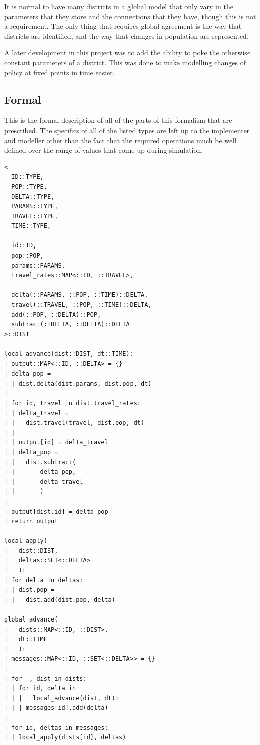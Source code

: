 \documentclass[twocolumn]{article}
\begin{document}
It is normal to have many districts in a global model that only vary in the parameters that they store and the connections that they have, though this is not a requirement. The only thing that requires global agreement is the way that districts are identified, and the way that changes in population are represented.

A later development in this project was to add the ability to poke the otherwise constant parameters of a district. This was done to make modelling changes of policy at fixed points in time easier.

\subsection{Formal}

This is the formal description of all of the parts of this formalism that are prescribed. The specifics of all of the listed types are left up to the implementer and modeller other than the fact that the required operations much be well defined over the range of values that come up during simulation.

\begin{verbatim}
<
  ID::TYPE, 
  POP::TYPE, 
  DELTA::TYPE, 
  PARAMS::TYPE, 
  TRAVEL::TYPE, 
  TIME::TYPE,
  
  id::ID, 
  pop::POP, 
  params::PARAMS, 
  travel_rates::MAP<::ID, ::TRAVEL>, 
  
  delta(::PARAMS, ::POP, ::TIME)::DELTA, 
  travel(::TRAVEL, ::POP, ::TIME)::DELTA, 
  add(::POP, ::DELTA)::POP, 
  subtract(::DELTA, ::DELTA)::DELTA
>::DIST

local_advance(dist::DIST, dt::TIME):
| output::MAP<::ID, ::DELTA> = {}
| delta_pop = 
| | dist.delta(dist.params, dist.pop, dt)
| 
| for id, travel in dist.travel_rates:
| | delta_travel = 
| |   dist.travel(travel, dist.pop, dt)
| | 
| | output[id] = delta_travel
| | delta_pop = 
| |   dist.subtract(
| |       delta_pop, 
| |       delta_travel
| |       )
| 
| output[dist.id] = delta_pop
| return output
  
local_apply(
|   dist::DIST, 
|   deltas::SET<::DELTA>
|   ):
| for delta in deltas:
| | dist.pop = 
| |   dist.add(dist.pop, delta)

global_advance(
|   dists::MAP<::ID, ::DIST>, 
|   dt::TIME
|   ):
| messages::MAP<::ID, ::SET<::DELTA>> = {}
| 
| for _, dist in dists:
| | for id, delta in 
| | |   local_advance(dist, dt):
| | | messages[id].add(delta)
| 
| for id, deltas in messages:
| | local_apply(dists[id], deltas)
 
\end{verbatim}
\end{document}
